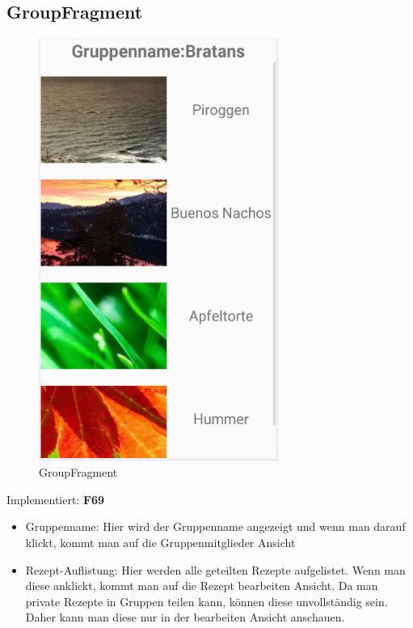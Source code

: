 \subsection{GroupFragment}
\begin{figure}[H]
	\centering
	\includegraphics[width=0.7\textwidth]{pics/groupFragment.png}%
	\caption{GroupFragment}%
	\label{view}%
\end{figure}
Implementiert: \textbf{F69}
\begin{itemize}[nosep]
	\item Gruppenname: Hier wird der Gruppenname angezeigt und wenn man darauf klickt, kommt man auf die Gruppenmitglieder Ansicht
	\item Rezept-Auflistung: Hier werden alle geteilten Rezepte aufgelistet. Wenn man diese anklickt, kommt man auf die Rezept bearbeiten Ansicht. Da man private Rezepte in Gruppen teilen kann, können diese unvollständig sein. Daher kann man diese nur in der bearbeiten Ansicht anschauen.
\end{itemize}

